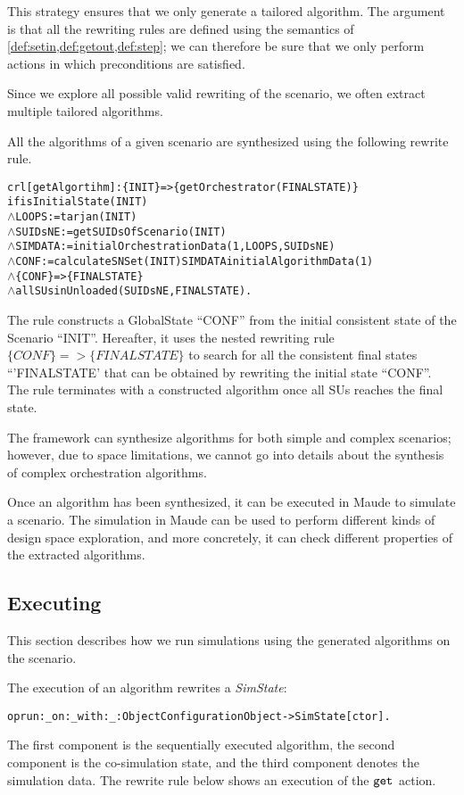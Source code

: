 This strategy ensures that we only generate a tailored algorithm. 
The argument is that all the rewriting rules are defined using the semantics of \cref{def:setin,def:getout,def:step}; we can therefore be sure that we only perform actions in which preconditions are satisfied.

Since we explore all possible valid rewriting of the scenario, we often extract multiple tailored algorithms.

All the algorithms of a given scenario are synthesized using the following rewrite rule.
\begin{alltt}
  \small
crl [getAlgortihm]: \{ INIT \} => \{ getOrchestrator(FINALSTATE) \}
if isInitialState(INIT)
  \(\land\) LOOPS := tarjan(INIT)
  \(\land\) SUIDsNE := getSUIDsOfScenario(INIT)
  \(\land\) SIMDATA := initialOrchestrationData(1,LOOPS,SUIDsNE)
  \(\land\) CONF := calculateSNSet(INIT) SIMDATA initialAlgorithmData(1)
  \(\land\) \{CONF\} => \{ FINALSTATE\} 
  \(\land\) allSUsinUnloaded(SUIDsNE, FINALSTATE) .
\end{alltt}

The rule constructs a GlobalState ``CONF'' from the initial consistent state of the Scenario ``INIT''.
Hereafter, it uses the nested rewriting rule $\{CONF\} => \{ FINALSTATE\} $ to search for all the consistent final states ``'FINALSTATE' that can be obtained by rewriting the initial state ``CONF''.
The rule terminates with a constructed algorithm once all SUs reaches the final state.

The framework can synthesize algorithms for both simple and complex scenarios; however, due to space limitations, we cannot go into details about the synthesis of complex orchestration algorithms.

Once an algorithm has been synthesized, it can be executed in Maude to simulate a scenario.
The simulation in Maude can be used to perform different kinds of design space exploration, and more concretely, it can check different properties of the extracted algorithms.

\subsection{Executing}
This section describes how we run simulations using the generated algorithms on the scenario.

The execution of an algorithm rewrites a \emph{SimState}:
\begin{alltt}
\small
op run:_on:_with:_ : Object Configuration Object -> SimState [ctor]. 
\end{alltt}
The first component is the sequentially executed algorithm, the second component is the co-simulation state, and the third component denotes the simulation data.
The rewrite rule below shows an execution of the $\mathtt{get}_{}$ action.

